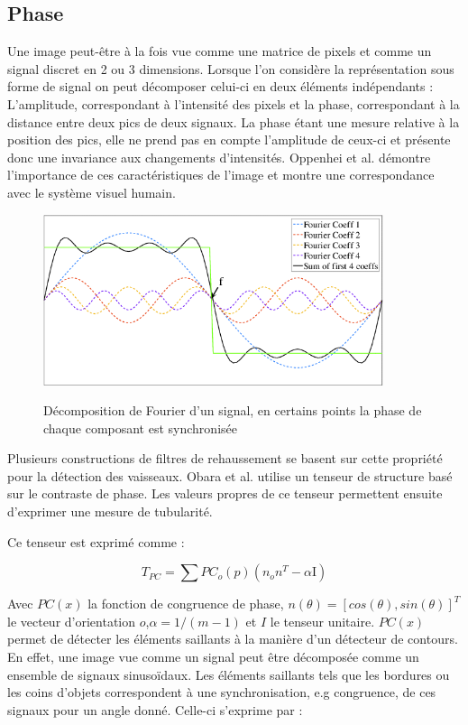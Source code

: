 \subsection{Phase}
\label{sec:EA:rehaussement:Phase}

Une image peut-être à la fois vue comme une matrice de pixels et comme un signal discret en 2 ou 3 dimensions. Lorsque l'on considère la représentation sous forme de signal on peut décomposer celui-ci en deux éléments indépendants : L'amplitude, correspondant à l'intensité des pixels et la phase, correspondant à la distance entre deux pics de deux signaux. La phase étant une mesure relative à la position des pics, elle ne prend pas en compte l'amplitude de ceux-ci et présente donc une invariance aux changements d'intensités. Oppenhei et al. \cite{Oppenheim1981_phase_importance} démontre l'importance de ces caractéristiques de l'image et montre une correspondance avec le système visuel humain. 

\begin{figure}[h]
  \centering
  \includegraphics[height=5cm]{Images/PC_decomposition.png}
  \label{fig:phase congruency}
  \caption{Décomposition de Fourier d'un signal, en certains points la phase de chaque composant est synchronisée}
\end{figure}

Plusieurs constructions de filtres de rehaussement se basent sur cette propriété pour la détection des vaisseaux. Obara et al. \cite{Obara2012_phase} utilise un tenseur de structure basé sur le contraste de phase. Les valeurs propres de ce tenseur permettent ensuite d'exprimer une mesure de tubularité.

Ce tenseur est exprimé comme :

\begin{equation}
  T_{PC} = \sum PC_{o}(p)(n_{o}n^T - \alpha \text{I})
\end{equation}

Avec $PC(x)$ la fonction de congruence de phase, $n(\theta)=[cos(\theta),sin(\theta)]^T$ le vecteur d'orientation $o$,$\alpha = 1/(m-1)$ et $I$ le tenseur unitaire. $PC(x)$ permet de détecter les éléments saillants à la manière d'un détecteur de contours.
En effet, une image vue comme un signal peut être décomposée comme un ensemble de signaux sinusoïdaux. Les éléments saillants tels que les bordures ou les coins d'objets correspondent à une synchronisation, e.g congruence, de ces signaux pour un angle donné. Celle-ci s'exprime par :

